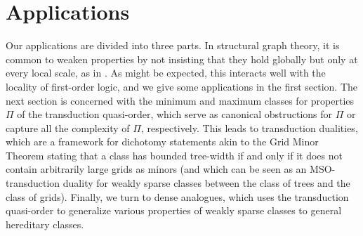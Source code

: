 \documentclass{lmcs}
\theoremstyle{definition}
\begin{document}
\part{Applications} \label{part:applications}
Our applications are divided into three parts. In structural graph theory, it is common to weaken properties by not insisting that they hold globally but only at every local scale, as in \cite{grohe2003local}. As might be expected, this interacts well with the locality of first-order logic, and we give some applications in the first section. The next section is concerned with the minimum and maximum classes for properties $\Pi$ of the transduction quasi-order, which serve as canonical obstructions for $\Pi$ or capture all the complexity of $\Pi$, respectively. This leads to transduction dualities, which are a framework for dichotomy statements akin to the Grid Minor Theorem \cite{robertson1986graph} stating that a class has bounded tree-width if and only if it does not contain arbitrarily large grids as minors (and which can be seen as an MSO-transduction duality for weakly sparse classes between the class of trees and the class of grids). Finally, we turn to dense analogues, which uses the transduction quasi-order to generalize various properties of weakly sparse classes to general hereditary classes.
\end{document}
